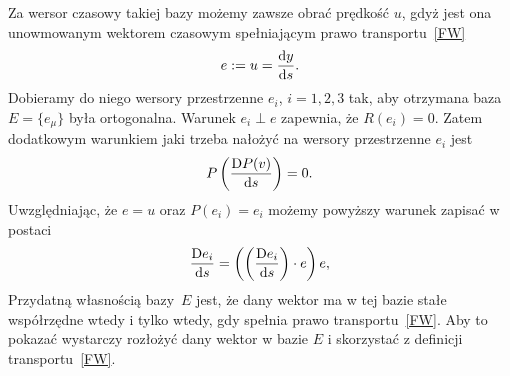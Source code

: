 Za wersor czasowy takiej bazy możemy zawsze obrać prędkość $u$, gdyż 
jest ona unowmowanym wektorem czasowym spełniającym 
prawo transportu~\eqref{FW}
\begin{align*}
e := u = \frac{\text{d} y}{\text{d} s}.
\end{align*}
Dobieramy do niego wersory 
przestrzenne $e_i$, $i=1,2,3$ tak, aby otrzymana baza $E=\{ e_\mu \}$ była
 ortogonalna.  Warunek $e_i \perp e$ zapewnia, że $R(e_i)=0$. 
Zatem dodatkowym warunkiem jaki trzeba nałożyć na wersory
przestrzenne $e_i$ jest 
\begin{align*}
P \left(\frac{\text{D} P(v)}{\text{d} s} \right)  = 0.
\end{align*} 
Uwzględniając, że $e=u$ oraz $P(e_i)=e_i$ możemy powyższy warunek
zapisać w postaci
\begin{align}\label{FWwkw}
\frac{\text{D} e_i }{\text{d} s} = 
\left( \left(\frac{\text{D} e_i }{\text{d} s}\right) \cdot e\right) e, 
\end{align}
Przydatną własnością bazy~$E$ jest, że dany wektor 
ma w tej bazie stałe współrzędne wtedy i tylko wtedy, gdy
spełnia prawo transportu~\eqref{FW}.
Aby to pokazać wystarczy rozłożyć dany wektor w bazie 
$E$ i skorzystać z definicji transportu~\eqref{FW}.



















\begin{comment}
\begin{definition}Mówimy, że wektor $v$ spełnia prawo \textbf{transportu 
Fermiego-Walkera} (FW) wzdłuż linii świata $y$ jeżeli
\begin{align} 
\frac{\widetilde{\D} v}{\d s}  : = \frac{\D v}{\d s} +
(v\cdot A) u - (v\cdot u) A = 0, \tag{FW} \label{FW}
\end{align}
gdzie $u = \dot{y}$ oraz $A=\frac{\D u}{\d s}$ to odpowiednio czterowektory
prędkości i przyspieszenia stoważyszone z~linią świata~$y$.
Wyrażenie $ \frac{\widetilde{\D} }{\d s}$ nazywamy \textbf{pochodną
Fermiego-Walkera}. Zauważmy, że w~przypadku zerowego przyspieszenia $(A=0)$
pochodna Fermiego-Walkera sprowadza się do pochodnej absolutnej, więc 
dla linii będące geodezyjną transport~\eqref{FW} sprowadza się się do 
transportu równoległego.
Niestety w ogólności transport równoległy
nie przekształca wektorów stycznych w wektory styczne. Transport taki 
 realizuje się przez prawa transportu~\eqref{FW}. 
\end{definition}
\end{comment}
